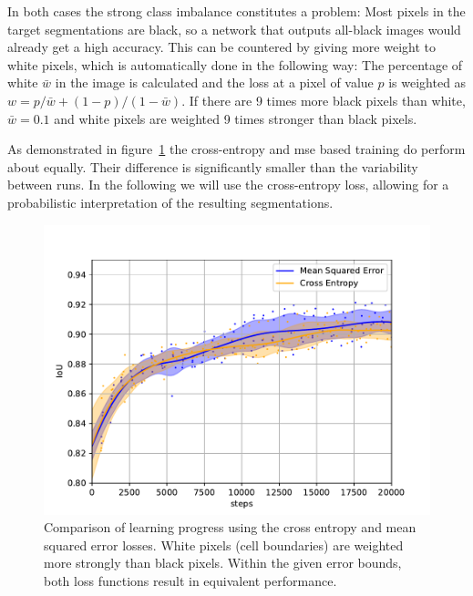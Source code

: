 \documentclass[aps,prl,twocolumn,groupedaddress,amsmath,amssymb]{revtex4-1}
\begin{document}
    In both cases the strong class imbalance constitutes a problem: Most pixels in the target 
    segmentations are black, so a network that outputs all-black images would already get a high 
    accuracy. This can be countered by giving more weight to white pixels, which is automatically 
    done in the following way: The percentage of white $\bar{w}$ in the image is calculated 
    and the loss at a pixel of value $p$ is weighted as $w = p/\bar{w} + (1-p)/(1-\bar{w})$. If there
    are 9 times more black pixels than white, $\bar{w}=0.1$ and white pixels are weighted 9 times 
    stronger than black pixels.

    As demonstrated in figure~\ref{fig:mse} the cross-entropy and mse based training do perform
    about equally. Their difference is significantly smaller than the variability between runs. In
    the following we will use the cross-entropy loss, allowing for a probabilistic interpretation
    of the resulting segmentations.

    \begin{figure}[tbp]
        \begin{center}
        \includegraphics[width=\linewidth]{figures/mse.pdf}
        \end{center}
        \caption{Comparison of learning progress using the cross entropy and mean squared error 
        losses. White pixels (cell boundaries) are weighted more strongly than black pixels. 
        Within the given error bounds, both loss functions result in equivalent performance.}
        \label{fig:mse}
    \end{figure}
\end{document}
